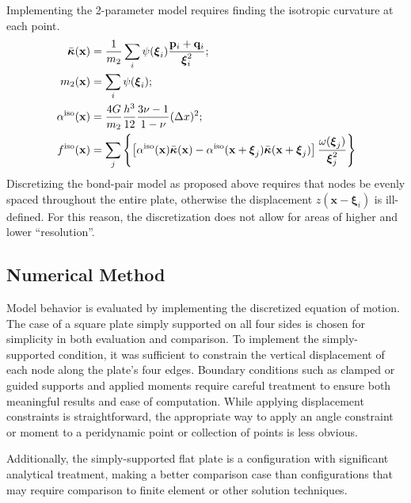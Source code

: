 \documentclass[preprint,review,12pt]{elsarticle}
\begin{document}
Implementing the 2-parameter model requires finding the isotropic curvature at each point.
%
\begin{align*}
    \bar{\boldsymbol{\kappa}}(\mathbf{x}) &= \frac{1}{m_2} \sum_i \psi(\boldsymbol{\xi}_i)\frac{\mathbf{p}_i +\mathbf{q}_i }{\boldsymbol{\xi}_i^2};\notag \\
    m_2(\mathbf{x})  &= \sum_i \psi(\boldsymbol{\xi}_i); \notag \\
    \alpha^\text{iso}(\mathbf{x}) &= \frac{4G}{m_2}\frac{h^3}{12}\frac{3\nu-1}{1-\nu}(\Delta x)^2;\\
    f^\text{iso}(\mathbf{x}) &= \sum_j \left\{\left[\alpha^\text{iso}(\mathbf{x})\bar{\boldsymbol{\kappa}}(\mathbf{x})-\alpha^\text{iso}(\mathbf{x}+\boldsymbol{\xi}_j)\bar{\boldsymbol{\kappa}}(\mathbf{x}+\boldsymbol{\xi}_j) \right] \frac{\omega(\boldsymbol{\xi}_j)}{\boldsymbol{\xi}_j^2} \right\}
\end{align*}
%
Discretizing the bond-pair model as proposed above requires that nodes be evenly spaced throughout the entire plate, otherwise the displacement \(z(\mathbf{x}-\boldsymbol{\xi}_i)\) is ill-defined. 
For this reason, the discretization does not allow for areas of higher and lower ``resolution''. 
%
\subsection{Numerical Method}
\label{sec:NumMethod}
Model behavior is evaluated by implementing the discretized equation of motion.
The case of a square plate simply supported on all four sides is chosen for simplicity in both evaluation and comparison.
To implement the simply-supported condition, it was sufficient to constrain the vertical displacement of each node along the plate's four edges.
Boundary conditions such as clamped or guided supports and applied moments require careful treatment to ensure both meaningful results and ease of computation.
While applying displacement constraints is straightforward, the appropriate way to apply an angle constraint or moment to a peridynamic point or collection of points is less obvious.

Additionally, the simply-supported flat plate is a configuration with significant analytical treatment, making a better comparison case than configurations that may require comparison to finite element or other solution techniques.
%
\end{document}
